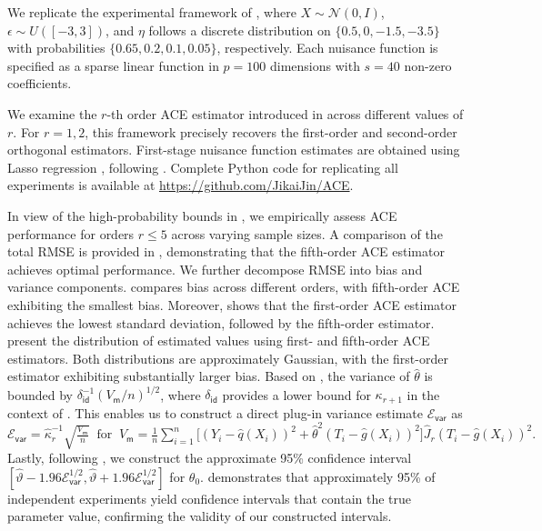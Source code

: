 \documentclass{article}
\def\eps{{\epsilon}}
\def\gE{{\mathcal{E}}}
\def\gN{{\mathcal{N}}}
\newcommand{\stext}[1]{\ \text{#1}\ }
\begin{document}
We replicate the experimental framework of \citet[Section 5]{mackey2018orthogonal}, where $X\sim\gN(0,I)$, $\eps\sim U([-3,3])$, and $\eta$ follows a discrete distribution on $\{0.5, 0, -1.5, -3.5\}$ with probabilities $\{0.65, 0.2, 0.1, 0.05\}$, respectively. Each nuisance function is specified as a sparse linear function in $p=100$ dimensions with $s=40$ non-zero coefficients.

We examine the $r$-th order ACE estimator introduced in  across different values of $r$. For $r=1,2$, this framework precisely recovers the first-order \citep{chernozhukov2018double} and second-order \citep{mackey2018orthogonal} orthogonal estimators. First-stage nuisance function estimates are obtained using Lasso regression \citep{tibshirani1996regression}, following . Complete Python code for replicating all experiments is available at \url{https://github.com/JikaiJin/ACE}.

In view of the high-probability bounds in , we empirically assess ACE performance for orders $r\leq 5$ across varying sample sizes. A comparison of the total RMSE is provided in , demonstrating that the fifth-order ACE estimator achieves optimal performance. We further decompose RMSE into bias and variance components.  compares bias across different orders, with fifth-order ACE exhibiting the smallest bias. Moreover,  shows that the first-order ACE estimator achieves the lowest standard deviation, followed by the fifth-order estimator.  present the distribution of estimated values using first- and fifth-order ACE estimators. Both distributions are approximately Gaussian, with the first-order estimator exhibiting substantially larger bias. Based on , the variance of $\hat\theta$ is bounded by $\delta_{\mathsf{id}}^{-1}(V_{\mathsf{m}}/n)^{1/2}$, where $\delta_{\mathsf{id}}$ provides a lower bound for $\kappa_{r+1}$ in the context of . This enables us to construct a direct plug-in variance estimate $\gE_{\mathsf{var}}$ as $\gE_{\mathsf{var}} = \hat{\kappa}_r^{-1}\sqrt{\frac{V_{\mathsf{m}}}{n}} \stext{ for } V_{\mathsf{m}} = \frac{1}{n}\sum_{i=1}^{n}\big[ (Y_i-\hat{q}(X_i))^2 +\hat{\theta}^2(T_i-\hat{g}(X_i))^2 \big] \hat{J}_r(T_i-\hat{g}(X_i))^2.$ Lastly, following , we construct the approximate 95\% confidence interval $[\hat{\vartheta}-1.96\gE_{\mathsf{var}}^{1/2},\hat{\vartheta}+1.96\gE_{\mathsf{var}}^{1/2}]$ for $\theta_0$.  demonstrates that approximately 95\% of independent experiments yield confidence intervals that contain the true parameter value, confirming the validity of our constructed intervals.
\end{document}
